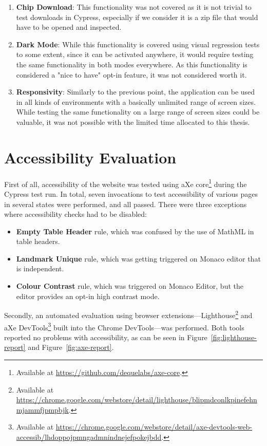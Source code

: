 \begin{enumerate}
    \item \textbf{Chip Download}: This functionality was not covered as it is not trivial to test downloads in Cypress, especially if we consider it is a zip file that would have to be opened and inspected.
    \item \textbf{Dark Mode}: While this functionality is covered using visual regression tests to some extent, since it can be activated anywhere, it would require testing the same functionality in both modes everywhere. As this functionality is considered a "nice to have" opt-in feature, it was not considered worth it.
    \item \textbf{Responsivity}: Similarly to the previous point, the application can be used in all kinds of environments with a basically unlimited range of screen sizes. While testing the same functionality on a large range of screen sizes could be valuable, it was not possible with the limited time allocated to this thesis.
\end{enumerate}

\section{Accessibility Evaluation}
\label{Evaluation-Accessibility}

First of all, accessibility of the website was tested using aXe core\footnote{Available at \url{https://github.com/dequelabs/axe-core}.} during the Cypress test run.
In total, seven invocations to test accessibility of various pages in several states were performed, and all passed.
There were three exceptions where accessibility checks had to be disabled:

\begin{itemize}
    \item \textbf{Empty Table Header} rule, which was confused by the use of MathML in table headers.
    \item \textbf{Landmark Unique} rule, which was getting triggered on Monaco editor that is independent.
    \item \textbf{Colour Contrast} rule, which was triggered on Monaco Editor, but the editor provides an opt-in high contrast mode.
\end{itemize}

Secondly, an automated evaluation using browser extensions---Lighthouse\footnote{Available at \url{https://chrome.google.com/webstore/detail/lighthouse/blipmdconlkpinefehnmjammfjpmpbjk}.} and aXe DevTools\footnote{Available at \url{https://chrome.google.com/webstore/detail/axe-devtools-web-accessib/lhdoppojpmngadmnindnejefpokejbdd}.} built into the Chrome DevTools---was performed.
Both tools reported no problems with accessibility, as can be seen in Figure~\ref{fig:lighthouse-report} and Figure~\ref{fig:axe-report}.

